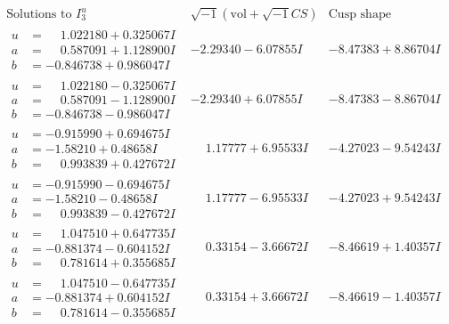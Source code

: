 \documentclass[1p]{elsarticle_modified}
\theoremstyle{definition}
\newcommand{\I}{\sqrt{-1}}
\begin{document}
$$\begin{array}{c|c|c}  
\text{Solutions to }I^u_{3}& \I (\text{vol} + \sqrt{-1}CS) & \text{Cusp shape}\\
 \hline 
\begin{aligned}
u &= \phantom{-}1.022180 + 0.325067 I \\
a &= \phantom{-}0.587091 + 1.128900 I \\
b &= -0.846738 + 0.986047 I\end{aligned}
 & -2.29340 - 6.07855 I & -8.47383 + 8.86704 I \\ \hline\begin{aligned}
u &= \phantom{-}1.022180 - 0.325067 I \\
a &= \phantom{-}0.587091 - 1.128900 I \\
b &= -0.846738 - 0.986047 I\end{aligned}
 & -2.29340 + 6.07855 I & -8.47383 - 8.86704 I \\ \hline\begin{aligned}
u &= -0.915990 + 0.694675 I \\
a &= -1.58210 + 0.48658 I \\
b &= \phantom{-}0.993839 + 0.427672 I\end{aligned}
 & \phantom{-}1.17777 + 6.95533 I & -4.27023 - 9.54243 I \\ \hline\begin{aligned}
u &= -0.915990 - 0.694675 I \\
a &= -1.58210 - 0.48658 I \\
b &= \phantom{-}0.993839 - 0.427672 I\end{aligned}
 & \phantom{-}1.17777 - 6.95533 I & -4.27023 + 9.54243 I \\ \hline\begin{aligned}
u &= \phantom{-}1.047510 + 0.647735 I \\
a &= -0.881374 - 0.604152 I \\
b &= \phantom{-}0.781614 + 0.355685 I\end{aligned}
 & \phantom{-}0.33154 - 3.66672 I & -8.46619 + 1.40357 I \\ \hline\begin{aligned}
u &= \phantom{-}1.047510 - 0.647735 I \\
a &= -0.881374 + 0.604152 I \\
b &= \phantom{-}0.781614 - 0.355685 I\end{aligned}
 & \phantom{-}0.33154 + 3.66672 I & -8.46619 - 1.40357 I \\ \hline\begin{aligned}

\end{aligned}
\end{array}$$
\end{document}
